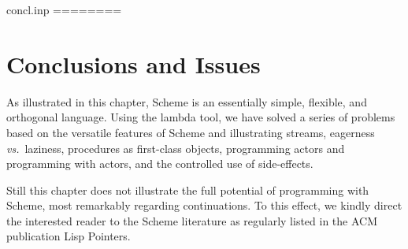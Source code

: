 concl.inp
========

\section{Conclusions and Issues}

As illustrated in this chapter, Scheme is an essentially simple,
flexible, and orthogonal language.  Using the lambda tool, we have
solved a series of problems based on the versatile features of Scheme
and illustrating streams, eagerness {\em vs.}\ laziness, procedures as
first-class objects, programming actors and programming with actors,
and the controlled use of side-effects.

Still this chapter does not illustrate the full potential of
programming with Scheme, most remarkably regarding continuations.  To
this effect, we kindly direct the interested reader to the Scheme
literature as regularly listed in the ACM publication Lisp Pointers.



